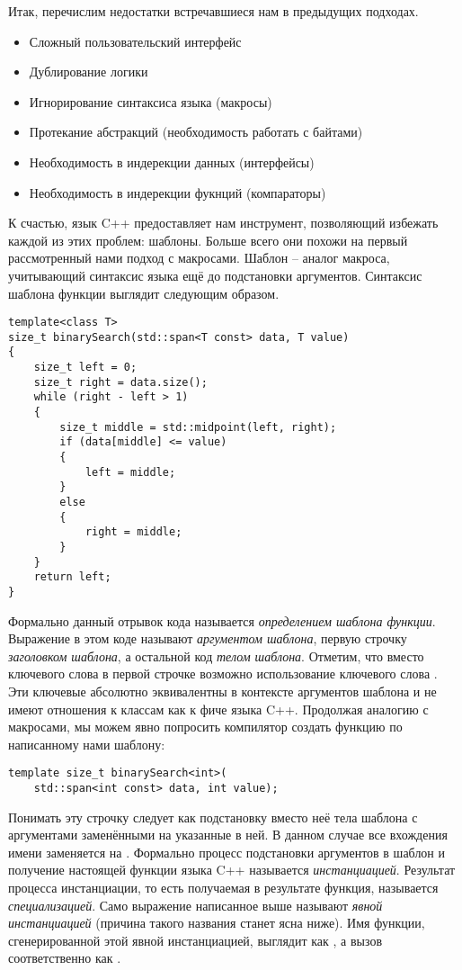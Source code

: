 Итак, перечислим недостатки встречавшиеся нам в предыдущих подходах.
\begin{itemize}
\item Сложный пользовательский интерфейс
\item Дублирование логики
\item Игнорирование синтаксиса языка (макросы)
\item Протекание абстракций (необходимость работать с байтами)
\item Необходимость в индерекции данных (интерфейсы)
\item Необходимость в индерекции фукнций (компараторы)
\end{itemize}
К счастью, язык C++ предоставляет нам инструмент, позволяющий избежать каждой из этих проблем: шаблоны. Больше всего они похожи на первый рассмотренный нами подход с макросами. Шаблон -- аналог макроса, учитывающий синтаксис языка ещё до подстановки аргументов. Синтаксис шаблона функции выглядит следующим образом.
\begin{verbatim}
template<class T>
size_t binarySearch(std::span<T const> data, T value)
{
    size_t left = 0;
    size_t right = data.size();
    while (right - left > 1)
    {
        size_t middle = std::midpoint(left, right);
        if (data[middle] <= value)
        {
            left = middle;
        }
        else
        {
            right = middle;
        }
    }
    return left;
}
\end{verbatim}
Формально данный отрывок кода называется \textit{определением шаблона функции}. Выражение  в этом коде называют \textit{аргументом шаблона}, первую строчку \textit{заголовком шаблона}, а остальной код \textit{телом шаблона}. Отметим, что вместо ключевого слова  в первой строчке возможно использование ключевого слова . Эти ключевые абсолютно эквивалентны в контексте аргументов шаблона и не имеют отношения к классам как к фиче языка C++. Продолжая аналогию с макросами, мы можем явно попросить компилятор создать функцию по написанному нами шаблону:
\begin{verbatim}
template size_t binarySearch<int>(
    std::span<int const> data, int value);
\end{verbatim}
Понимать эту строчку следует как подстановку вместо неё тела шаблона с аргументами заменёнными на указанные в ней. В данном случае все вхождения имени  заменяется на . Формально процесс подстановки аргументов в шаблон и получение настоящей функции языка C++ называется \textit{инстанциацией}. Результат процесса инстанциации, то есть получаемая в результате функция, называется \textit{специализацией}. Само выражение написанное выше называют \textit{явной инстанциацией} (причина такого названия станет ясна ниже). Имя функции, сгенерированной этой явной инстанциацией, выглядит как , а вызов соответственно как .

